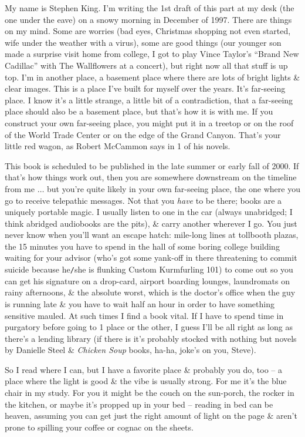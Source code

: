 \documentclass{article}
\numberwithin{equation}{section}
\begin{document}
My name is Stephen King. I'm writing the 1st draft of this part at my desk (the one under the eave) on a snowy morning in December of 1997. There are things on my mind. Some are worries (bad eyes, Christmas shopping not even started, wife under the weather with a virus), some are good things (our younger son made a surprise visit home from college, I got to play Vince Taylor's ``Brand New Cadillac'' with The Wallflowers at a concert), but right now all that stuff is up top. I'm in another place, a basement place where there are lots of bright lights \& clear images. This is a place I've built for myself over the years. It's far-seeing place. I know it's a little strange, a little bit of a contradiction, that a far-seeing place should also be a basement place, but that's how it is with me. If you construct your own far-seeing place, you might put it in a treetop or on the roof of the World Trade Center or on the edge of the Grand Canyon. That's your little red wagon, as Robert McCammon says in 1 of his novels.

This book is scheduled to be published in the late summer or early fall of 2000. If that's how things work out, then you are somewhere downstream on the timeline from me $\ldots$ but you're quite likely in your own far-seeing place, the one where you go to receive telepathic messages. Not that you \textit{have} to be there; books are a uniquely portable magic. I usually listen to one in the car (always unabridged; I think abridged audiobooks are the pits), \& carry another wherever I go. You just never know when you'll want an escape hatch: mile-long lines at tollbooth plazas, the 15 minutes you have to spend in the hall of some boring college building waiting for your advisor (who's got some yank-off in there threatening to commit suicide because he\texttt{/}she is flunking Custom Kurmfurling 101) to come out so you can get his signature on a drop-card, airport boarding lounges, laundromats on rainy afternoons, \& the absolute worst, which is the doctor's office when the guy is running late \& you have to wait half an hour in order to have something sensitive mauled. At such times I find a book vital. If I have to spend time in purgatory before going to 1 place or the other, I guess I'll be all right as long as there's a lending library (if there is it's probably stocked with nothing but novels by Danielle Steel \& \textit{Chicken Soup} books, ha-ha, joke's on you, Steve).

So I read where I can, but I have a favorite place \& probably you do, too -- a place where the light is good \& the vibe is usually strong. For me it's the blue chair in my study. For you it might be the couch on the sun-porch, the rocker in the kitchen, or maybe it's propped up in your bed -- reading in bed can be heaven, assuming you can get just the right amount of light on the page \& aren't prone to spilling your coffee or cognac on the sheets.
\end{document}
